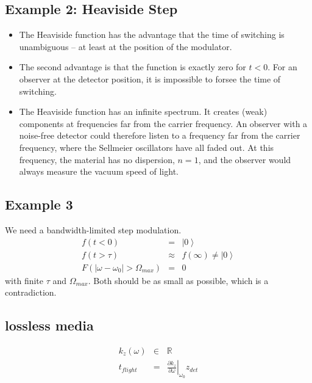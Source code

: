 \documentclass[12pt,a4paper,twoside,openright,BCOR10mm,headsepline,titlepage,abstracton,chapterprefix,final]{scrreprt}
\newcommand\wavenumber{k}
\begin{document}
\subsection{Example 2: Heaviside Step}
\begin{itemize}
 \item The Heaviside function has the advantage that the time of switching is unambiguous -- at least at the position of the modulator.
 \item The second advantage is that the function is exactly zero for $t<0$.
       For an observer at the detector position, it is impossible to forsee the time of switching.
 \item The Heaviside function has an infinite spectrum.
       It creates (weak) components at frequencies far from the carrier frequency.
       An observer with a noise-free detector could therefore listen to a frequency far from the carrier frequency,
       where the Sellmeier oscillators have all faded out.
       At this frequency, the material has no dispersion, $n=1$, 
       and the observer would always measure the vacuum speed of light.
\end{itemize}

\subsection{Example 3}
We need a bandwidth-limited step modulation.
\begin{eqnarray}
 f( t < 0 ) &=& \left|0\right> \\
 f( t > \tau) &\approx& f(\infty) \neq \left|0\right> \\
 F(|\omega - \omega_0| > \Omega_{max}) &=& 0
\end{eqnarray}
with finite $\tau$ and $\Omega_{max}$.
Both should be as small as possible, which is a contradiction.

\subsection{lossless media}
\begin{eqnarray}
 \wavenumber_z(\omega) &\in& \mathbb{R} \\
 t_{flight} &=& \left. \frac{\partial \wavenumber_z}{\partial \omega}\right|_{\omega_0} z_{det}
\end{eqnarray}
\end{document}
